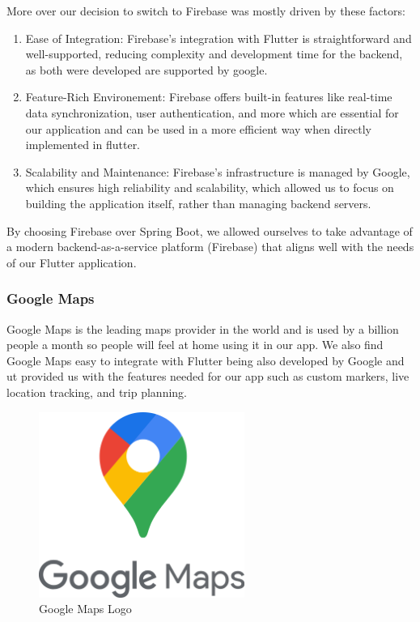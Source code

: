 \documentclass[a4paper, 12pt]{report} %
\begin{document}
                More over our decision to switch to Firebase was mostly driven by these factors:
                \begin{enumerate}
                    \item \raggedright Ease of Integration: Firebase’s integration with Flutter is straightforward and well-supported, reducing complexity and development time for the backend, as both were developed are supported by google.
                    \item Feature-Rich Environement: Firebase offers built-in features like real-time data synchronization, user authentication, and more which are essential for our application and can be used in a more efficient way when directly implemented in flutter.
                    \item Scalability and Maintenance: Firebase’s infrastructure is managed by Google, which ensures high reliability and scalability,  which allowed us to focus on building the application itself, rather than managing backend servers.
                \end{enumerate}

                By choosing Firebase over Spring Boot, we allowed ourselves to take advantage of a modern backend-as-a-service platform (Firebase) that aligns well with the needs of our Flutter application. 

            \subsubsection{Google Maps}
                Google Maps is the leading maps provider in the world and is used by a billion people a month \cite{google_maps_wiki} so people will feel at home using it in our app. We also find Google Maps easy to integrate with Flutter being also developed by Google and ut provided us with the features needed for our app such as custom markers, live location tracking, and trip planning. 

                \begin{figure}[H]
                    \centering
                    \includegraphics[width=0.6\textwidth]{google_maps_logo.png}
                    \caption{Google Maps Logo \cite{google_maps_logo}}
                    \label{fig:google_maps_logo}
                \end{figure}
\end{document}
